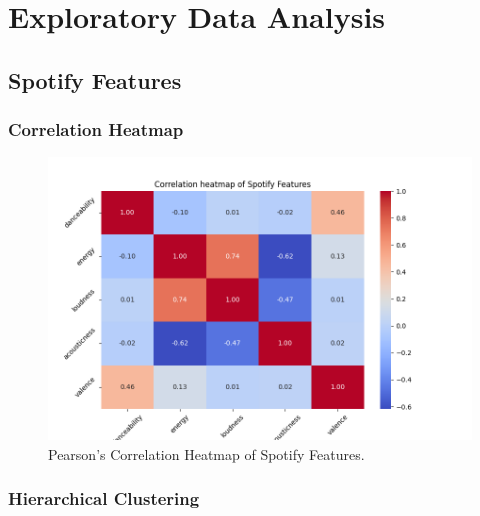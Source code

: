 \chapter{Exploratory Data Analysis}
\label{cha:eda}


\section{Spotify Features}
\label{sec:spotifyfeatures}

\subsection*{Correlation Heatmap}
\label{sec:correlationheatmapsspotifyfeatures}

\begin{center}
\begin{figure}[H]
  \centering
  \includegraphics[width=6in]{img/corr_heatmap_spotify_features.png}
  \caption{Pearson's Correlation Heatmap of Spotify Features.}
  \label{Figure:fig_beh}
\end{figure}
\end{center}

\subsection*{Hierarchical Clustering}
\label{sec:hierarchicalclustering}


